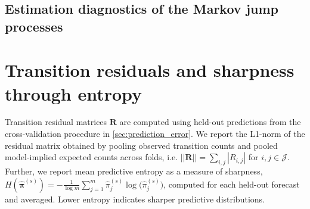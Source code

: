 \appendix


\clearpage
\begin{landscape}

\section{Estimation diagnostics of the Markov jump processes}
\label{sec:diagnostics_estimation}

\begin{table}[h!]
\centering
\caption{Akaike information criterion (AIC; computed from the log-likelihood at the score-optimal parameters) and per-observation gradient norm of the score objective.}
\label{tab:AIC_tab}
\scriptsize

\end{table}

\end{landscape}
\clearpage

%
%

\newpage

\section{Transition residuals and sharpness through entropy} \label{sec:transition_L1}  \label{sec:sharpness}
Transition residual matrices  $\bm R$ are computed using held-out predictions from the cross-validation procedure in \cref{sec:prediction_error}.
We report the L1-norm of the residual matrix obtained by pooling observed transition counts and pooled model-implied expected counts across folds, i.e. $|| \bm R || = \sum_{i,j} |  R_{i,j}|$ for $i,j \in \mathcal J$. %
Further, we report mean predictive entropy as a measure of sharpness,
$H(\widehat{\boldsymbol\pi}^{(s)}) = - \frac{1}{\log m}\sum_{j=1}^{m}\widehat{\pi}^{(s)}_j \log\!\big(\widehat{\pi}^{(s)}_j\big)$,
computed for each held-out forecast and averaged. Lower entropy indicates sharper predictive distributions.

